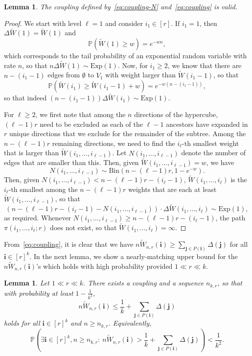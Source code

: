 \documentclass[11pt]{article}
\newtheorem{lemma}[theorem]{Lemma}
\theoremstyle{definition}
\theoremstyle{remark}
\theoremstyle{remark}
\numberwithin{theorem}{section}
\providecommand{\P}{}
\renewcommand{\P}{\mathbb{P}}
\begin{document}
\begin{lemma}\label{lem:exp-coupling}
    The coupling defined by~\eqref{eq:coupling-N} and~\eqref{eq:coupling} is valid.
\end{lemma}
\begin{proof}
    We start with level $\ell=1$ and consider $i_1\in[r]$. If $i_1=1$, then $\Delta \widetilde{W}(1)=\widetilde{W}(1)$ and
    \[
    \P(\widetilde{W}(1)\ge w)=e^{-wn},
    \]
    which corresponds to the tail probability of an exponential random variable with rate $n$, so that $n\Delta \widetilde{W}(1)\sim\text{Exp}(1)$. Now, for $i_1\ge 2$, we know that there are $n-(i_1-1)$ edges from $\emptyset$ to $V_1$ with weight larger than $\widetilde{W}(i_1-1)$, so that
    \[
    \P(\widetilde{W}(i_1)\ge \widetilde{W}(i_1-1)+ w)=e^{-w(n-(i_1-1))},
    \]
    so that indeed $(n-(i_1-1))\Delta \widetilde{W}(i_1)\sim \text{Exp}(1)$.

    For $\ell\ge2$, we first note that among the $n$ directions of the hypercube, $(\ell-1)r$ need to be excluded as each of the $\ell-1$ ancestors have expanded in $r$ unique directions that we exclude for the remainder of the subtree.
    Among the $n-(\ell-1)r$ remaining directions, we need to find the $i_\ell$-th smallest weight that is larger than $\widetilde{W}(i_1,\dots,i_{\ell-1})$. Let $N(i_1,\dots,i_{\ell-1})$ denote the number of edges that are smaller than this. Then, given $\widetilde{W}(i_1,\dots,i_{\ell-1})=w$, we have
    \[
    N(i_1,\dots,i_{\ell-1})\sim\text{Bin}(n-(\ell-1)r,1-e^{-w}).
    \]
    Then, given $N(i_1,\dots,i_{\ell-1})<n-(\ell-1)r-(i_\ell-1)$, $\widetilde{W}(i_1,\dots,i_\ell)$ is the $i_\ell$-th smallest among the $n-(\ell-1)r$ weights that are each at least $\widetilde{W}(i_1,\dots,i_{\ell-1})$, so that
    \[
        (n-(\ell-1)r-(i_\ell-1)-N(i_1,\dots,i_{\ell-1}))\cdot\Delta \widetilde{W}(i_1,\dots,i_\ell)\sim\text{Exp}(1),
    \]
    as required. Whenever $N(i_1,\dots,i_{\ell-1})\ge n-(\ell-1)r-(i_\ell-1)$, the path $\pi(i_1,\dots,i_\ell;r)$ does not exist, so that $\widetilde{W}(i_1,\dots,i_\ell)=\infty$.
\end{proof}

From~\eqref{eq:coupling}, it is clear that we have $n\widetilde{W}_{n,r}(\bm{i}) \geq \sum_{\bm{j} \in P(\bm{i})}\Delta(\bm{j})$ for all $\bm{i} \in [r]^{k}$. In the next lemma, we show a nearly-matching upper bound for the $n\widetilde{W}_{n,r}(\bm{i})$'s which holds with high probability provided $1 \ll r \ll k$.

\begin{lemma}\label{lem:poi-coupling}
    Let $1\ll r\ll k$. There exists a coupling and a sequence $n_{k,r}$, so that with probability at least $1-\frac1{k^2}$, 
    \[
    n\widetilde W_{n,r}(\bm i)\le \frac1k+\sum_{\bm j\in P(\bm i)}\Delta(\bm j)
    \]
    holds for all $\bm i\in[r]^k$ and $n\ge n_{k,r}$. Equivalently,
    \begin{equation}\label{eq:coupling-guarantee}
    \P\left(\exists \bm i\in [r]^k,n\ge n_{k,r}:\ n\widetilde W_{n,r}(\bm i)>\frac1k+\sum_{\bm j\in P(\bm i)}\Delta(\bm j)\right)<\frac1{k^2}.
    \end{equation}
\end{lemma}
\end{document}
